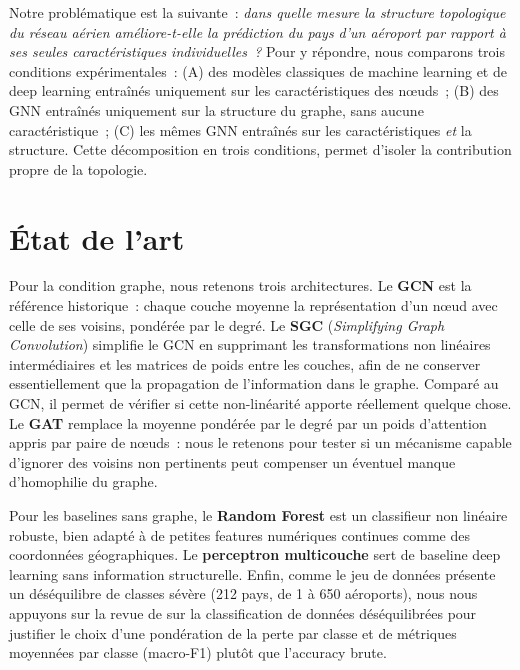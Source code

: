 \documentclass[french]{llncs}
\begin{document}
    Notre problématique est la suivante~: 
    \emph{dans quelle mesure la structure topologique du réseau aérien améliore-t-elle la prédiction du pays d'un aéroport par 
    rapport à ses seules caractéristiques individuelles~?} Pour y répondre, nous comparons trois conditions expérimentales~: 
    (A) des modèles classiques de machine learning et de deep learning entraînés uniquement sur les caractéristiques des nœuds~; 
    (B) des GNN entraînés uniquement sur la structure du graphe, sans aucune caractéristique~; 
    (C) les mêmes GNN entraînés sur les caractéristiques \emph{et} la structure. Cette décomposition en trois conditions, 
    permet d'isoler la contribution propre de la topologie.

    \section{État de l'art} \label{sect:eda}

    Pour la condition graphe, nous retenons trois architectures. Le \textbf{GCN} \cite{Kipf2017} est la référence historique~: 
    chaque couche moyenne la représentation d'un nœud avec celle de ses voisins, pondérée par le degré. Le \textbf{SGC}
    (\emph{Simplifying Graph Convolution}) \cite{Wu2019} simplifie le GCN en supprimant les transformations non linéaires
    intermédiaires et les matrices de poids entre les couches, afin de ne conserver essentiellement que la propagation de 
    l'information dans le graphe. Comparé au GCN, il permet de vérifier si cette non-linéarité apporte réellement quelque chose. 
    Le \textbf{GAT} \cite{Velickovic2018} remplace la moyenne pondérée par le degré par un poids d'attention appris par paire 
    de nœuds~: nous le retenons pour tester si un mécanisme capable d'ignorer des voisins non pertinents peut compenser 
    un éventuel manque d'homophilie du graphe.

    Pour les baselines sans graphe, le \textbf{Random Forest} \cite{Breiman2001} est un classifieur non linéaire robuste, 
    bien adapté à de petites features numériques continues comme des coordonnées géographiques. 
    Le \textbf{perceptron multicouche} \cite{Rumelhart1986} sert de baseline deep learning sans information structurelle. 
    Enfin, comme le jeu de données présente un déséquilibre de classes sévère (212 pays, de 1 à 650 aéroports), 
    nous nous appuyons sur la revue de \cite{Wang2021} sur la classification de données déséquilibrées pour justifier 
    le choix d'une pondération de la perte par classe et de métriques moyennées par classe (macro-F1) 
    plutôt que l'accuracy brute.
\end{document}
